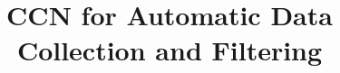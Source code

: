 \documentclass{beamer}
\author{}
\title{\huge CCN for Automatic Data Collection and Filtering}
\begin{document}
\titlepageframe










\end{document}
